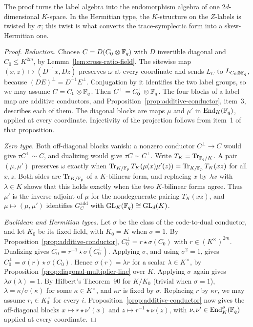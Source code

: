 The proof turns the label algebra into the endomorphism algebra of one
\(2d\)-dimensional \(K\)-space.  In the Hermitian type, the \(K\)-structure
on the \(Z\)-labels is twisted by \(\sigma\); this twist is what converts
the trace-symplectic form into a skew-Hermitian one.

\begin{proof}
\emph{Reduction.}  Choose \(C=D(C_0\otimes\mathbb F_q)\) with \(D\) invertible
diagonal and \(C_0\leq K^{2m}\), by Lemma~\ref{lem:cross-ratio-field}.  The
sitewise map \((x,z)\mapsto(D^{-1}x,Dz)\) preserves \(\omega\) at every
coordinate and sends \(L_C\) to \(L_{C_0\otimes\mathbb F_q}\), because
\((DE)^\perp=D^{-1}E^\perp\).  Conjugation by it identifies the two label
groups, so we may assume \(C=C_0\otimes\mathbb F_q\).  Then
\(C^\perp=C_0^\perp\otimes\mathbb F_q\).  The four blocks of a label map are
additive conductors, and Proposition~\ref{prop:additive-conductor}, item~3,
describes each of them.  The diagonal blocks are maps \(\mu\) and \(\mu'\)
in \(\operatorname{End}_K(\mathbb F_q)\), applied at every coordinate.  Injectivity of the
projection follows from item~1 of that proposition.

\emph{Zero type.}  Both off-diagonal blocks vanish: a nonzero conductor
\(C^\perp\to C\) would give \(\tau C^\perp\sim C\), and dualizing would give
\(\tau C\sim C^\perp\).  Write \(T_K=\operatorname{Tr}_{\mathbb F_q/K}\).  A pair
\((\mu,\mu')\) preserves \(\omega\) exactly when
\(\operatorname{Tr}_{K/\mathbb F_p}T_K(\mu(x)\mu'(z))=\operatorname{Tr}_{K/\mathbb F_p}T_K(xz)\) for all \(x,z\).  Both
sides are \(\operatorname{Tr}_{K/\mathbb F_p}\) of a \(K\)-bilinear form, and replacing \(x\) by
\(\lambda x\) with \(\lambda\in K\) shows that this holds exactly when the
two \(K\)-bilinear forms agree.  Thus \(\mu'\) is the inverse adjoint of
\(\mu\) for the nondegenerate pairing \(T_K(xz)\), and
\(\mu\mapsto(\mu,\mu')\) identifies \(G^{\mathrm{add}}_C\) with
\(\mathrm{GL}_K(\mathbb F_q)\cong\mathrm{GL}_d(K)\).

\emph{Euclidean and Hermitian types.}  Let \(\sigma\) be the class of the
code-to-dual conductor, and let \(K_0\) be its fixed field, with \(K_0=K\)
when \(\sigma=1\).  By Proposition~\ref{prop:additive-conductor},
\(C_0^\perp=r\star\sigma(C_0)\) with \(r\in(K^\times)^{2m}\).  Dualizing
gives \(C_0=r^{-1}\star\sigma(C_0^\perp)\).  Applying \(\sigma\), and using
\(\sigma^2=1\), gives \(C_0^\perp=\sigma(r)\star\sigma(C_0)\).  Hence
\(\sigma(r)=\lambda r\) for a scalar \(\lambda\in K^\times\), by
Proposition~\ref{prop:diagonal-multiplier-line} over \(K\).  Applying
\(\sigma\) again gives \(\lambda\sigma(\lambda)=1\).  By Hilbert's
Theorem~90 for \(K/K_0\) (trivial when \(\sigma=1\)),
\(\lambda=\kappa/\sigma(\kappa)\) for some
\(\kappa\in K^\times\), and \(\kappa r\) is fixed by \(\sigma\).  Replacing
\(r\) by \(\kappa r\), we may assume \(r_i\in K_0^\times\) for every \(i\).
Proposition~\ref{prop:additive-conductor} now gives the off-diagonal blocks
\(x\mapsto r\star\nu'(x)\) and \(z\mapsto r^{-1}\star\nu(z)\), with
\(\nu,\nu'\in\operatorname{End}_K^\sigma(\mathbb F_q)\) applied at every coordinate.


\end{proof}
